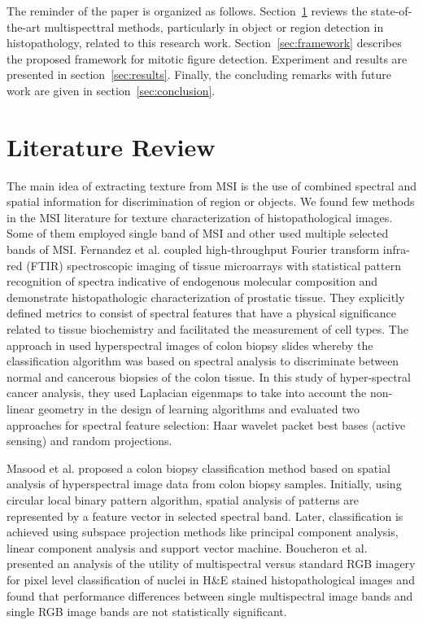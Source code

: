 \documentclass[10pt,twocolumn,letterpaper]{article}
\begin{document}
The reminder of the paper is organized as follows. Section~\ref{sec:previous} reviews the state-of-the-art multispecttral methods, particularly in object or region detection in histopathology, related to this research work. Section~\ref{sec:framework} describes the proposed framework for mitotic figure detection. Experiment and results are presented in section~\ref{sec:results}. Finally, the concluding remarks with future work are given in section~\ref{sec:conclusion}.

\section{Literature Review}
\label{sec:previous}

The main idea of extracting texture from MSI is the use of combined spectral and spatial information for discrimination of region or objects. We found few methods in the MSI literature for texture characterization of histopathological images. Some of them employed single band of MSI and other used multiple selected bands of MSI. Fernandez et al. \cite{fernandez2005} coupled high-throughput Fourier transform infra-red (FTIR) spectroscopic imaging of tissue microarrays with statistical pattern recognition of spectra indicative of endogenous molecular composition and demonstrate histopathologic characterization of prostatic tissue. They explicitly defined metrics to consist of spectral features that have a physical significance related to tissue biochemistry and facilitated the measurement of cell types. The approach in \cite{woolfe2006} used hyperspectral images of colon biopsy slides whereby the classification algorithm was based on spectral analysis to discriminate between normal and cancerous biopsies of the colon tissue. In this study of hyper-spectral cancer analysis, they used Laplacian eigenmaps to take into account the non-linear geometry in the design of learning algorithms and evaluated two approaches for spectral feature selection: Haar wavelet packet best bases (active sensing) and random projections.

Masood et al. \cite{masood2009} proposed a colon biopsy classification method based on spatial analysis of hyperspectral image data from colon biopsy samples. Initially, using circular local binary pattern algorithm, spatial analysis of patterns are represented by a feature vector in selected spectral band. Later, classification is achieved using subspace projection methods like principal component analysis, linear component analysis and support vector machine. Boucheron et al. \cite{boucheron2007} presented an analysis of the utility of multispectral versus standard RGB imagery for pixel level classification of nuclei in H\&E stained histopathological images and found that performance differences between single multispectral image bands and single RGB image bands are not statistically significant. 
\end{document}
